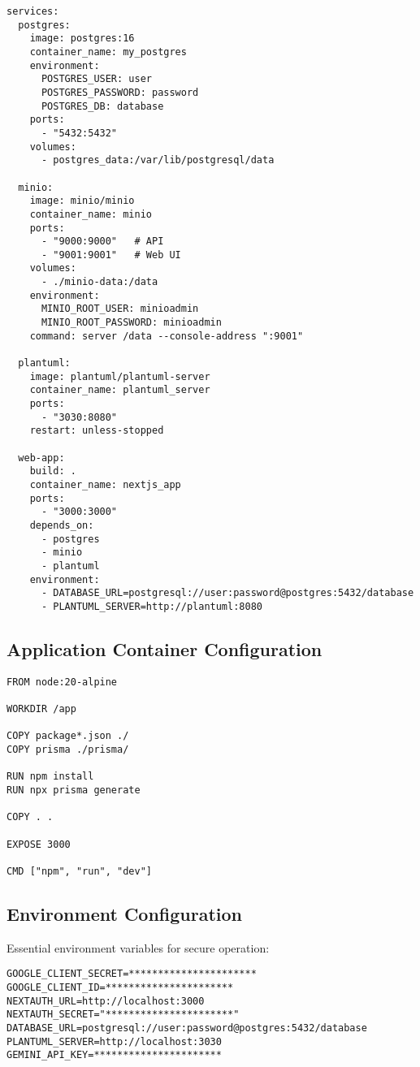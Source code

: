 \begin{lstlisting}[caption=Docker Compose Services Configuration]
services:
  postgres:
    image: postgres:16
    container_name: my_postgres
    environment:
      POSTGRES_USER: user
      POSTGRES_PASSWORD: password
      POSTGRES_DB: database
    ports:
      - "5432:5432"
    volumes:
      - postgres_data:/var/lib/postgresql/data

  minio:
    image: minio/minio
    container_name: minio
    ports:
      - "9000:9000"   # API
      - "9001:9001"   # Web UI
    volumes:
      - ./minio-data:/data
    environment:
      MINIO_ROOT_USER: minioadmin
      MINIO_ROOT_PASSWORD: minioadmin
    command: server /data --console-address ":9001"

  plantuml:
    image: plantuml/plantuml-server
    container_name: plantuml_server
    ports:
      - "3030:8080"
    restart: unless-stopped

  web-app:
    build: .
    container_name: nextjs_app
    ports:
      - "3000:3000"
    depends_on:
      - postgres
      - minio
      - plantuml
    environment:
      - DATABASE_URL=postgresql://user:password@postgres:5432/database
      - PLANTUML_SERVER=http://plantuml:8080
\end{lstlisting}

\subsection{Application Container Configuration}

\begin{lstlisting}[caption=Next.js Application Dockerfile]
FROM node:20-alpine

WORKDIR /app

COPY package*.json ./
COPY prisma ./prisma/

RUN npm install
RUN npx prisma generate

COPY . .

EXPOSE 3000

CMD ["npm", "run", "dev"]
\end{lstlisting}


\subsection{Environment Configuration}

Essential environment variables for secure operation:

\begin{lstlisting}[caption=Environment Variables]
GOOGLE_CLIENT_SECRET=**********************
GOOGLE_CLIENT_ID=**********************
NEXTAUTH_URL=http://localhost:3000
NEXTAUTH_SECRET="**********************"
DATABASE_URL=postgresql://user:password@postgres:5432/database
PLANTUML_SERVER=http://localhost:3030
GEMINI_API_KEY=**********************
\end{lstlisting}

